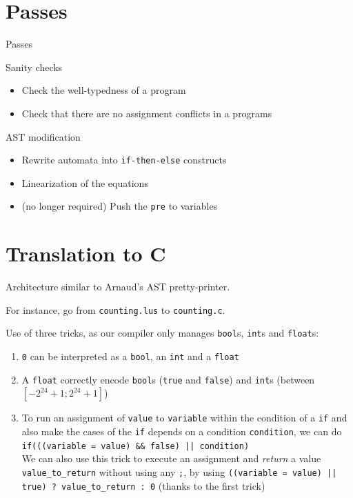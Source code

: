 \documentclass{beamer}
\begin{document}
\section{Passes}
\begin{frame}{Passes}
	\begin{block}{Sanity checks}
		\begin{itemize}
			\item Check the well-typedness of a program
			\item Check that there are no assignment conflicts in a programs
		\end{itemize}
	\end{block}
	\begin{block}{AST modification}
		\begin{itemize}
			\item Rewrite automata into \texttt{if-then-else} constructs
			\item Linearization of the equations
			\item (no longer required) Push the \texttt{pre} to variables
		\end{itemize}
	\end{block}
\end{frame}

\section{Translation to C}
\begin{frame}

	Architecture similar to Arnaud's AST pretty-printer.

	\pause

	For instance, go from \texttt{counting.lus} to \texttt{counting.c}.

    \pause

	Use of three tricks, as our compiler only manages \texttt{bool}s, \texttt{int}s and \texttt{float}s:
		\begin{enumerate}
			\item \texttt{0} can be interpreted as a \texttt{bool}, an \texttt{int} and a \texttt{float}
			\pause
			\item A \texttt{float} correctly encode \texttt{bool}s (\texttt{true} and \texttt{false}) and \texttt{int}s (between $[-2^{24} + 1; 2^{24} + 1]$)
			\pause
			\item To run an assignment of \texttt{value} to \texttt{variable} within the condition of a \texttt{if} and also make the cases of the \texttt{if} depends on a condition \texttt{condition}, we can do \texttt{if(((variable = value) \&\& false) || condition)}\\
			\pause
			We can also use this trick to execute an assignment and \textit{return} a value \texttt{value\_to\_return} without using any \texttt{;}, by using \texttt{((variable = value) || true) ? value\_to\_return : 0} (thanks to the first trick)
		\end{enumerate}
\end{frame}
\end{document}
